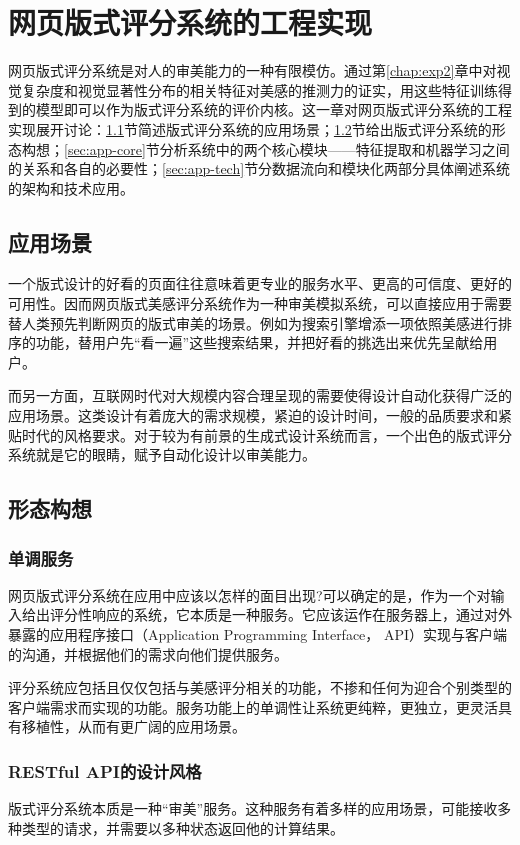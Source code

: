 \chapter{网页版式评分系统的工程实现}
\label{chap:application}

网页版式评分系统是对人的审美能力的一种有限模仿。通过第\ref{chap:exp2}章中对视觉复杂度和视觉显著性分布的相关特征对美感的推测力的证实，用这些特征训练得到的模型即可以作为版式评分系统的评价内核。这一章对网页版式评分系统的工程实现展开讨论：\ref{sec:app-app}节简述版式评分系统的应用场景；\ref{sec:app-shape}节给出版式评分系统的形态构想；\ref{sec:app-core}节分析系统中的两个核心模块——特征提取和机器学习之间的关系和各自的必要性；\ref{sec:app-tech}节分数据流向和模块化两部分具体阐述系统的架构和技术应用。

\section{应用场景}
\label{sec:app-app}
一个版式设计的好看的页面往往意味着更专业的服务水平、更高的可信度、更好的可用性\cite{Casal2008The, Li2010Increasing, Lindgaard2011}。因而网页版式美感评分系统作为一种审美模拟系统，可以直接应用于需要替人类预先判断网页的版式审美的场景。例如为搜索引擎增添一项依照美感进行排序的功能，替用户先“看一遍”这些搜索结果，并把好看的挑选出来优先呈献给用户。

而另一方面，互联网时代对大规模内容合理呈现的需要使得设计自动化获得广泛的应用场景。这类设计有着庞大的需求规模，紧迫的设计时间，一般的品质要求和紧贴时代的风格要求。对于较为有前景的生成式设计系统而言，一个出色的版式评分系统就是它的眼睛，赋予自动化设计以审美能力。

\section{形态构想}
\label{sec:app-shape}
\subsection{单调服务}
网页版式评分系统在应用中应该以怎样的面目出现?可以确定的是，作为一个对输入给出评分性响应的系统，它本质是一种服务。它应该运作在服务器上，通过对外暴露的应用程序接口（Application Programming Interface， API）实现与客户端的沟通，并根据他们的需求向他们提供服务。

评分系统应包括且仅仅包括与美感评分相关的功能，不掺和任何为迎合个别类型的客户端需求而实现的功能。服务功能上的单调性让系统更纯粹，更独立，更灵活具有移植性，从而有更广阔的应用场景。

\subsection{RESTful API的设计风格}
版式评分系统本质是一种“审美”服务。这种服务有着多样的应用场景，可能接收多种类型的请求，并需要以多种状态返回他的计算结果。


